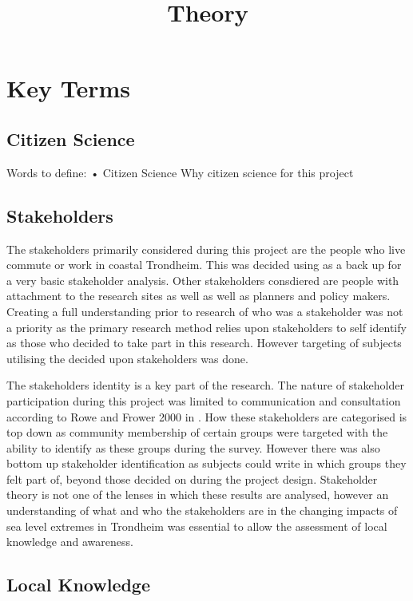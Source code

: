\documentclass{article}
\begin{document}
\title{Theory}

\section{Key Terms}

\subsection{Citizen Science}
Words to define: 
•	Citizen Science \cite{tweddle_guide_2012}
Why citizen science for this project 

\subsection{Stakeholders}

The stakeholders primarily considered during this project are the people who live commute or work in coastal Trondheim. This was decided using \cite{reed_stakeholder_nodate} as a back up for a very basic stakeholder analysis. Other stakeholders consdiered are people with attachment to the research sites as well as well as planners and policy makers. Creating a full understanding prior to research of who was a stakeholder was not a priority as the primary research method relies upon stakeholders to self identify as those who decided to take part in this research. However targeting of subjects utilising the decided upon stakeholders was done. 

The stakeholders identity is a key part of the research. The nature of stakeholder participation during this project was limited to communication and consultation according to Rowe and Frower 2000 in \cite{reed_stakeholder_nodate}. How these stakeholders are categorised is top down as community membership of certain groups were targeted with the ability to identify as these groups during the survey. However there was also bottom up stakeholder identification as subjects could write in which groups they felt part of, beyond those decided on during the project design. Stakeholder theory is not one of the lenses in which these results are analysed, however an understanding of what and who the stakeholders are in the changing impacts of sea level extremes in Trondheim was essential to allow the assessment of local knowledge and awareness. 

\subsection{Local Knowledge}
\end{document}
